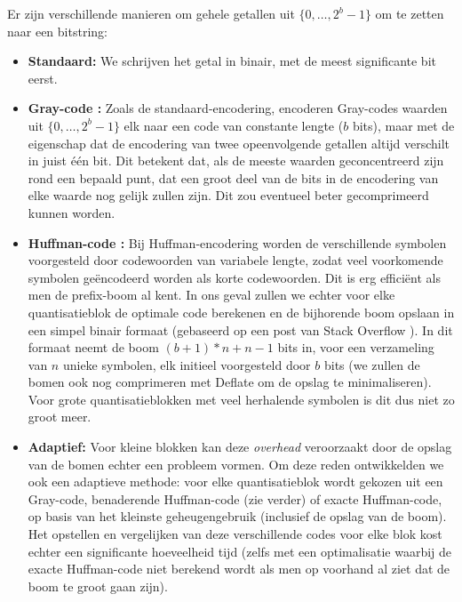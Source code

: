 Er zijn verschillende manieren om gehele getallen uit $\{0, \dots, 2^b - 1\}$ om te zetten naar een bitstring:
\begin{itemize}

\item \textbf{Standaard:} We schrijven het getal in binair, met de meest significante bit eerst.

\item \textbf{Gray-code \cite{ref:graycode}:} Zoals de standaard-encodering, encoderen Gray-codes waarden uit $\{0, \dots, 2^b - 1\}$ elk naar een code van constante lengte ($b$ bits), maar met de eigenschap dat de encodering van twee opeenvolgende getallen altijd verschilt in juist \'e\'en bit. Dit betekent dat, als de meeste waarden geconcentreerd zijn rond een bepaald punt, dat een groot deel van de bits in de encodering van elke waarde nog gelijk zullen zijn. Dit zou eventueel beter gecomprimeerd kunnen worden.

\item \textbf{Huffman-code \cite{ref:huffman_coding}:} Bij Huffman-encodering worden de verschillende symbolen voorgesteld door codewoorden van variabele lengte, zodat veel voorkomende symbolen ge\"encodeerd worden als korte codewoorden. Dit is erg effici\"ent als men de prefix-boom al kent. In ons geval zullen we echter voor elke quantisatieblok de optimale code berekenen en de bijhorende boom opslaan in een simpel binair formaat (gebaseerd op een post van Stack Overflow \cite{ref:huffman_tree}). In dit formaat neemt de boom $(b + 1)*n + n - 1$ bits in, voor een verzameling van $n$ unieke symbolen, elk initieel voorgesteld door $b$ bits (we zullen de bomen ook nog comprimeren met Deflate om de opslag te minimaliseren). Voor grote quantisatieblokken met veel herhalende symbolen is dit dus niet zo groot meer.

\item \textbf{Adaptief:} Voor kleine blokken kan deze \textit{overhead} veroorzaakt door de opslag van de bomen echter een probleem vormen. Om deze reden ontwikkelden we ook een adaptieve methode: voor elke quantisatieblok wordt gekozen uit een Gray-code, benaderende Huffman-code (zie verder) of exacte Huffman-code, op basis van het kleinste geheugengebruik (inclusief de opslag van de boom). Het opstellen en vergelijken van deze verschillende codes voor elke blok kost echter een significante hoeveelheid tijd (zelfs met een optimalisatie waarbij de exacte Huffman-code niet berekend wordt als men op voorhand al ziet dat de boom te groot gaan zijn).\\


\end{itemize}
